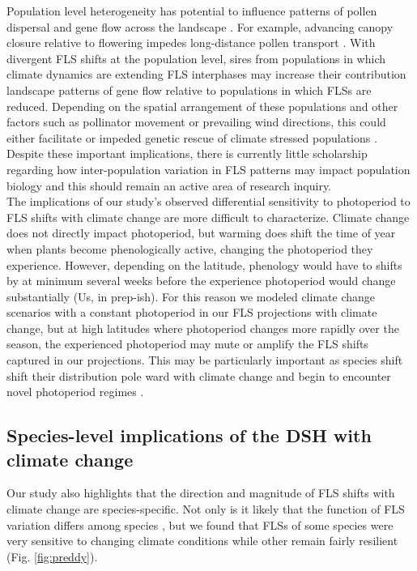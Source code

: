\documentclass[11pt]{article}
\begin{document}
\noindent Population level heterogeneity has potential to influence patterns of pollen dispersal and gene flow across the landscape \citep{Borycka2017,Pace:2018aa}. For example, advancing canopy closure relative to flowering impedes long-distance pollen transport \citep{Mileron2012}. With divergent FLS shifts at the population level, sires from populations in which climate dynamics are extending FLS interphases may increase their contribution landscape patterns of gene flow relative to populations in which FLSs are reduced. Depending on the spatial arrangement of these populations and other factors such as pollinator movement or prevailing wind directions, this could either facilitate or impeded genetic rescue of climate stressed populations \citep{Kling:2020aa}. Despite these important implications, there is currently little scholarship regarding how inter-population variation in FLS patterns may impact population biology and this should remain an active area of research inquiry.\\

\noindent The implications of our study's observed differential sensitivity to photoperiod to FLS shifts with climate change are more difficult to characterize.  Climate change does not directly impact photoperiod, but warming does shift the time of year when plants become phenologically active, changing the photoperiod they experience.  However, depending on the latitude, phenology would have to shifts by at minimum several weeks before the experience photoperiod would change substantially \citep{}(Us, in prep-ish). For this reason we modeled climate change scenarios with a constant photoperiod in our FLS projections with climate change, but at high latitudes where photoperiod changes more rapidly over the season, the experienced photoperiod may mute or amplify the FLS shifts captured in our projections. This may be particularly important as species shift shift their distribution pole ward with climate change and begin to encounter novel photoperiod regimes \citep{WAY:2015aa}.\\ %

\subsection*{Species-level implications of the DSH with climate change}
\noindent  Our study also highlights that the direction and magnitude of FLS shifts with climate change are species-specific. Not only is it likely that the function of FLS variation differs among species \citep{Buonaiuto2020}, but we found that FLSs of some species were very sensitive to changing climate conditions while other remain fairly resilient (Fig. \ref{fig:preddy}).\\
\end{document}
